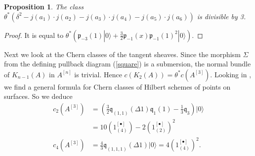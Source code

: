\documentclass{amsart}
\newcommand{\hilb}[1]{^{[#1]}}
\newcommand{\vac}{|0\rangle}
\newcommand{\p}{\mathfrak{p}}
\newcommand{\pone}{ \mathfrak{p}_{ - 1} }
\newcommand{\kum}[2]{K_{ #2 }( #1 )}
\theoremstyle{plain}
\newtheorem{proposition}[theorem]{Proposition}
\theoremstyle{definition}
\theoremstyle{remark}
\begin{document}
\begin{proposition}
The class $\theta^*\left(\delta^2 - j(a_1)\cdot j(a_2)- j(a_3)\cdot j(a_4)- j(a_5)\cdot j(a_6)\right)$ is divisible by 3.
\end{proposition}
\begin{proof}
It is equal to $\theta^*\left(\p_{-3}(1)\vac +\frac{3}{2}\pone(x)\pone(1)^2\vac \right)$.
\end{proof}

Next we look at the Chern classes of the tangent sheaves. Since the morphism $\Sigma$ from the defining pullback diagram (\ref{square}) is a submersion, the normal bundle of $\kum{A}{n-1}$ in $A\hilb{n}$ is trivial. Hence $c(\kum{A}{2}) = \theta^* c(A\hilb{3})$. Looking in \cite[Sect.~8]{Generating}, we find a general formula for Chern classes of Hilbert schemes of points on surfaces. So we deduce
\begin{align*}
c_2(A\hilb{3}) &= \left(\tfrac{3}{2} \mathfrak{q}_{(1,1)}(\Delta 1) \mathfrak{q}_1(1) -\tfrac{1}{3} \mathfrak{q}_3\right)\vac \\
 &= 10(1\hilb{\bullet}_{(4)})  -2(1\hilb{\bullet}_{(2)})^2 \\
c_4(A\hilb{3}) &= \tfrac{4}{3} \mathfrak{q}_{(1,1,1)}(\Delta 1)\vac = 4 (1\hilb{\bullet}_{(4)})^2. 
\end{align*}





\end{document}
